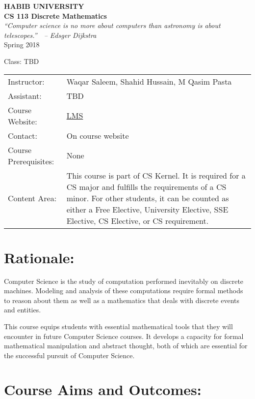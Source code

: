 \documentclass[a4paper]{article}
\begin{document}
\begin{center}

  {\LARGE\bf HABIB UNIVERSITY}\\[10pt]

  {\large\bf CS 113 Discrete Mathematics}\\[10pt]

  {\it ``Computer science is no more about computers than astronomy is about telescopes.''$\quad$-- Edsger Dijkstra}\\[10pt]

  Spring 2018
  
  Class: TBD

\begin{tabular}{lp{}}
  Instructor:&  Waqar Saleem, Shahid Hussain, M Qasim Pasta\\
  Assistant:&  TBD\\
  Course Website:&  \href{}{LMS}\\
  Contact:&  On course website\\

Course Prerequisites:&  None\\
Content Area: & This course is part of CS Kernel. It is required for a CS major and fulfills the requirements of a CS minor. For other students, it can be counted as either a Free Elective, University Elective, SSE Elective, CS Elective, or CS requirement. 
\end{tabular}

\end{center}

\section{Rationale:}

Computer Science is the study of computation performed inevitably on discrete machines. Modeling and analysis of these computations require formal methods to reason about them as well as a mathematics that deals with discrete events and entities.

This course equips students with essential mathematical tools that they will encounter in future Computer Science courses. It develops a capacity for formal mathematical manipulation and abstract thought, both of which are essential for the successful pursuit of Computer Science.

\section{Course Aims and Outcomes:}
\end{document}
